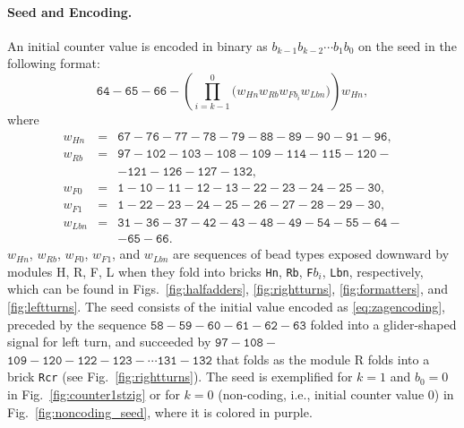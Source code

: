 \documentclass[twocolumn]{svjour3}
\begin{document}
\paragraph{Seed and Encoding.}
An initial counter value is encoded in binary as $b_{k-1}b_{k-2} \cdots b_1b_0$ on the seed in the following format:
\begin{equation} \label{eq:zagencoding}
\texttt{64}{-}\texttt{65}{-}\texttt{66}{-}\left( \prod^0_{i = k-1} \bigl(  w_{Hn} w_{Rb} w_{Fb_i} w_{Lbn} \bigr) \right) w_{Hn}, 
\end{equation}
where 
\begin{eqnarray*}
w_{Hn} &=& \texttt{67}{-}\texttt{76}{-}\texttt{77}{-}\texttt{78}{-}\texttt{79}{-}\texttt{88}{-}\texttt{89}{-}\texttt{90}{-}\texttt{91}{-}\texttt{96},\\
w_{Rb} &=& \texttt{97}{-}\texttt{102}{-}\texttt{103}{-}\texttt{108}{-}\texttt{109}{-}\texttt{114}{-}\texttt{115}{-}\texttt{120}{-} \\
& & {-}\texttt{121}{-}\texttt{126}{-}\texttt{127}{-}\texttt{132},\\
w_{F0} &=& \texttt{1}{-}\texttt{10}{-}\texttt{11}{-}\texttt{12}{-}\texttt{13}{-}\texttt{22}{-}\texttt{23}{-}\texttt{24}{-}\texttt{25}{-}\texttt{30},\\
w_{F1} &=& \texttt{1}{-}\texttt{22}{-}\texttt{23}{-}\texttt{24}{-}\texttt{25}{-}\texttt{26}{-}\texttt{27}{-}\texttt{28}{-}\texttt{29}{-}\texttt{30},\\
 w_{Lbn} &=& \texttt{31}{-}\texttt{36}{-}\texttt{37}{-}\texttt{42}{-}\texttt{43}{-}\texttt{48}{-}\texttt{49}{-}\texttt{54}{-}\texttt{55}{-}\texttt{64}{-}\\
& & {-}\texttt{65}{-}\texttt{66}.
\end{eqnarray*}
$w_{Hn}$, $w_{Rb}$, $w_{F0}$, $w_{F1}$, and $w_{Lbn}$ are sequences of bead types exposed downward by modules H, R, F, L when they fold into bricks \texttt{Hn}, \texttt{Rb}, \texttt{F}$b_i$, \texttt{Lbn}, respectively, which can be found in Figs.~\ref{fig:halfadders}, \ref{fig:rightturns}, \ref{fig:formatters}, and \ref{fig:leftturns}.
The seed consists of the initial value encoded as \eqref{eq:zagencoding}, preceded by the sequence $\texttt{58}{-}\texttt{59}{-}\texttt{60}{-}\texttt{61}{-}\texttt{62}{-}\texttt{63}$ folded into a glider-shaped signal for left turn, and succeeded by $\texttt{97}{-}\texttt{108}{-}$ $\texttt{109}{-}\texttt{120}{-}\texttt{122}{-}\texttt{123}{-} \cdots\texttt{131}{-}\texttt{132}$ that folds as the module R folds into a brick {\tt Rcr} (see Fig.~\ref{fig:rightturns}).
The seed is exemplified for $k = 1$ and $b_0 = 0$ in Fig.~\ref{fig:counter1stzig} or for $k = 0$ (non-coding, i.e., initial counter value 0) in Fig.~\ref{fig:noncoding_seed}, where it is colored in purple.
\end{document}

